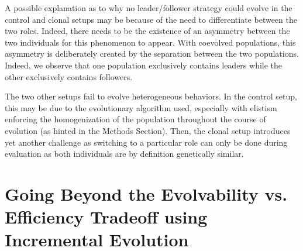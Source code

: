     A possible explanation as to why no leader/follower strategy could evolve in the control and clonal setups may be because of the need to differentiate between the two roles. Indeed, there needs to be the existence of an asymmetry between the two individuals for this phenomenon to appear. With coevolved populations, this asymmetry is deliberately created by the separation between the two populations. Indeed, we observe that one population exclusively contains leaders while the other exclusively contains followers. 

    The two other setups fail to evolve heterogeneous behaviors. In the control setup, this may be due to the evolutionary algorithm used, especially with elistism enforcing the homogenization of the population throughout the course of evolution (as hinted in the Methods Section). Then, the clonal setup introduces yet another challenge as switching to a particular role can only be done during evaluation as both individuals are by definition genetically similar.

    \begin{table}[h]
      \caption{\textbf{Evolution of a cooperative strategy.}
      Repartition of the different strategies evolved in each of the runs where cooperation evolved for each setup in the foraging task. We indicate in each cell the number of simulations where a particular strategy evolved.}
      \label{tab:ForagingBehaviors}
    \end{table}

\section{Going Beyond the Evolvability vs. Efficiency Tradeoff using Incremental Evolution}

